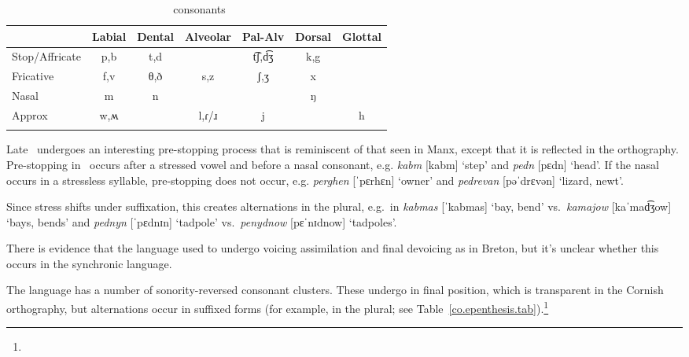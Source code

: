 \documentclass[output=paper,colorlinks,citecolor=brown]{langscibook}
\begin{document}
\begin{table}
\caption{\co\ consonants}
\label{cornish.consonants.tab}
\begin{tabular}[t]{lcccccc}
\lsptoprule
         & Labial & Dental & Alveolar & Pal-Alv & Dorsal & Glottal \\
\midrule
Stop/Affricate  & p,b    & t,d    &          & t͡ʃ,d͡ʒ & k,g    & \\
Fricative     & f,v    & θ,ð    & s,z      & ʃ,ʒ     & x      & \\
Nasal    & m      & n      &          &         & ŋ      & \\
Approx   & w,ʍ    &        & l,ɾ/ɹ    & j       &        & h \\
\lspbottomrule
\end{tabular}
\end{table}

Late \co\ undergoes an interesting pre-stopping process that is reminiscent of that seen in Manx, except that it is reflected in the orthography. Pre-stopping in \co\ occurs after a stressed vowel and before a nasal consonant, e.g. \emph{kabm} [kabm] `step' and \emph{pedn} [pɛdn] `head'. If the nasal occurs in a stressless syllable, pre-stopping does not occur, e.g. \emph{perghen} [ˈpɛrhɛn] `owner' and \emph{pedrevan} [pəˈdrɛvən] `lizard, newt'.

Since stress shifts under suffixation, this creates alternations in the plural, e.g.\ in \emph{kabmas} [ˈkabmas] `bay, bend' vs.\ \emph{kamajow} [kaˈmad͡ʒow] `bays, bends' and \emph{pednyn} [ˈpɛdnɪn] `tadpole' vs.\ \emph{penydnow} [pɛˈnɪdnow] `tadpoles'.

There is evidence that the language used to undergo voicing assimilation and final devoicing as in Breton, but it's unclear whether this occurs in the synchronic language.

The language has a number of sonority-reversed consonant clusters. These undergo  in final position, which is transparent in the Cornish orthography, but alternations occur in suffixed forms (for example, in the plural; see Table~\ref{co.epenthesis.tab}).\footnote{} 
\end{document}
